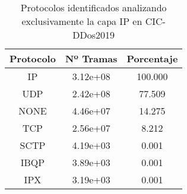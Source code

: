 \begin{table}[H]
    \begin{center}
        \begin{tabular}{|c | c c|} 
            \hline
            \textbf{Protocolo} & \textbf{Nº Tramas} & \textbf{Porcentaje}\\
            \hline\hline
IP & 3.12e+08 & 100.000 \\
UDP & 2.42e+08 & 77.509 \\
NONE & 4.46e+07 & 14.275 \\
TCP & 2.56e+07 & 8.212 \\
SCTP & 4.19e+03 & 0.001 \\
IBQP & 3.89e+03 & 0.001 \\
IPX & 3.19e+03 & 0.001 \\
            \hline
        \end{tabular}
    \end{center}
    \caption{Protocolos identificados analizando exclusivamente la capa IP en CIC-DDos2019}
    \label{table:cicddos2019protocolsip}
\end{table}
